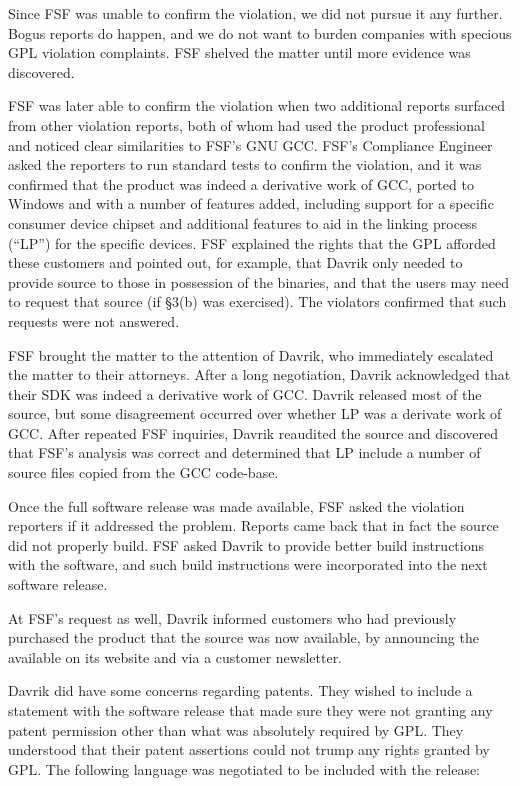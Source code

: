 \documentclass[12pt]{report}
\begin{document}
Since FSF was unable to confirm the violation, we did not pursue it any
further.  Bogus reports do happen, and we do not want to burden companies
with specious GPL violation complaints.  FSF shelved the matter until
more evidence was discovered.

FSF was later able to confirm the violation when two additional reports
surfaced from other violation reports, both of whom had used the product
professional and noticed clear similarities to FSF's GNU GCC\@.  FSF's
Compliance Engineer asked the reporters to run standard tests to confirm
the violation, and it was confirmed that the product was indeed a
derivative work of GCC, ported to Windows and with a number of features
added, including support for a specific consumer device chipset and
additional features to aid in the linking process (``LP'') for the
specific devices.  FSF explained the rights that the GPL afforded these
customers and pointed out, for example, that Davrik only needed to provide
source to those in possession of the binaries, and that the users may need
to request that source (if \S 3(b) was exercised).  The violators
confirmed that such requests were not answered.

FSF brought the matter to the attention of Davrik, who immediately
escalated the matter to their attorneys.  After a long negotiation, Davrik
acknowledged that their SDK was indeed a derivative work of GCC\@.  Davrik
released most of the source, but some disagreement occurred over whether LP
was a derivate work of GCC\@.  After repeated FSF inquiries, Davrik
reaudited the source and discovered that FSF's analysis was correct and
determined that LP include a number of source files copied from the GCC
code-base.

\label{davrik-build-problems}
Once the full software release was made available, FSF asked the
violation reporters if it addressed the problem.  Reports came back that
in fact the source did not properly build.  FSF asked Davrik to provide
better build instructions with the software, and such build instructions
were incorporated into the next software release.

At FSF's request as well, Davrik informed customers who had previously
purchased the product that the source was now available, by announcing
the available on its website and via a customer newsletter.

Davrik did have some concerns regarding patents.  They wished to include a
statement with the software release that made sure they were not granting
any patent permission other than what was absolutely required by GPL\@.
They understood that their patent assertions could not trump any rights
granted by GPL\@.  The following language was negotiated to be included
with the release:
\end{document}

